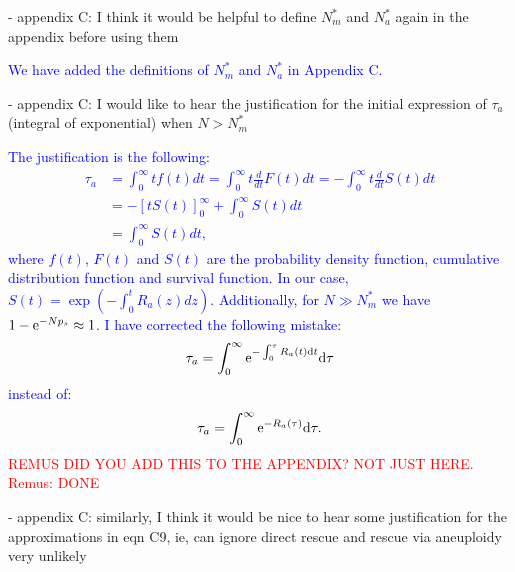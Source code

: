 \documentclass[12pt]{extarticle}
\renewcommand{\d}{{\rm d}}
\newcommand{\e}{{\rm e}}
\begin{document}
- appendix C: I think it would be helpful to define $N_m^*$ and $N_a^*$ again in the appendix before using them

\textcolor{blue}{We have added the definitions of $N_m^*$ and $N_a^*$ in Appendix C. } %

- appendix C: I would like to hear the justification for the initial expression of $\tau_a$ (integral of exponential) when $N>N_m^*$

\textcolor{blue}{%
The justification is the following: 
\begin{align*}
\tau_a&=\int_0^\infty tf(t)dt=\int_0^\infty t\frac{d}{dt}F(t)dt=-\int_0^\infty t\frac{d}{dt}S(t)dt\\
&=-\left[tS(t)\right]_0^\infty+\int_0^\infty S(t)dt\\
&=\int_0^\infty S(t)dt,
\end{align*}
where $f(t)$, $F(t)$ and $S(t)$ are the probability density function, cumulative distribution function and survival function.
In our case, $S(t)=\exp\left(-\int_0^t R_a(z)dz\right)$.
Additionally, for $N\gg N_m^*$ we have $1-\e^{-Np_s}\approx1$. I have corrected the following mistake:
\begin{equation*}
\tau_a=\int_0^\infty \e^{-\int_0^\tau R_a(t)\d t}\d\tau
\end{equation*}
instead of:
\begin{equation*}
\tau_a=\int_0^\infty \e^{-R_a(\tau)}\d\tau.
\end{equation*}
}
\textcolor{red}{REMUS DID YOU ADD THIS TO THE APPENDIX? NOT JUST HERE. Remus: DONE}

- appendix C: similarly, I think it would be nice to hear some justification for the approximations in eqn C9, ie, can ignore direct rescue and rescue via aneuploidy very unlikely
\end{document}
